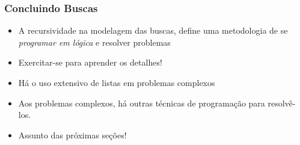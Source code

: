 \begin{frame}[fragile]
\frametitle{Concluindo Buscas}

\begin{block}{}
\begin{itemize}
  
  
  \item A recursividade na modelagem das buscas, define uma metodologia de se \textit{programar em lógica} e resolver problemas
    \pause
  \item Exercitar-se para aprender os detalhes!
    \pause
  \item Há o uso extensivo de listas em problemas complexos
  
  \pause
  \item Aos problemas complexos, há outras técnicas de programação
  para resolvê-los.
  
  
  \pause
  \item Assunto das próximas seções!
\end{itemize}

\end{block}

\end{frame}


